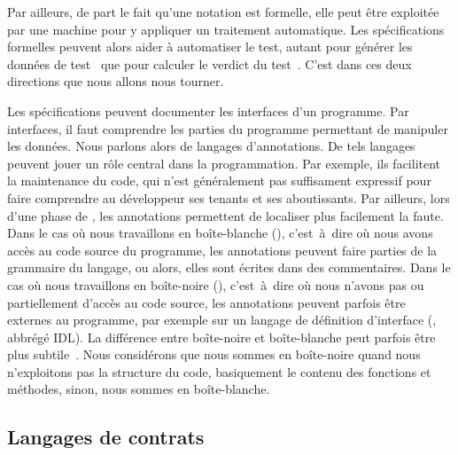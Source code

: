 Par ailleurs, de part le fait qu'une notation est formelle, elle peut être
exploitée par une machine pour y appliquer un traitement automatique.  Les
spécifications formelles peuvent alors aider à {\strong automatiser le test},
autant pour générer les données de test~ que pour calculer le verdict du test~.  C'est dans ces
deux directions que nous allons nous tourner.

Les spécifications peuvent documenter les {\strong interfaces} d'un programme.
Par interfaces, il faut comprendre les parties du programme permettant de
manipuler les données. Nous parlons alors de {\strong langages d'annotations}.
De tels langages peuvent jouer un rôle central dans la programmation. Par
exemple, ils facilitent la maintenance du code, qui n'est généralement pas
suffisament expressif pour faire comprendre au développeur ses tenants et ses
aboutissants. Par ailleurs, lors d'une phase de , les
annotations permettent de localiser plus facilement la faute. Dans le cas où
nous travaillons en boîte-blanche (), c'est~à~dire où nous
avons accès au code source du programme, les annotations peuvent faire parties
de la grammaire du langage, ou alors, elles sont écrites dans des {\strong
commentaires}. Dans le cas où nous travaillons en boîte-noire
(), c'est~à~dire où nous n'avons pas ou partiellement
d'accès au code source, les annotations peuvent parfois être externes au
programme, par exemple sur un langage de définition d'interface
(, abbrégé IDL). La différence entre
boîte-noire et boîte-blanche peut parfois être plus subtile~.
Nous considérons que nous sommes en boîte-noire quand nous n'exploitons pas la
structure du code, basiquement le contenu des fonctions et méthodes, sinon, nous
sommes en boîte-blanche.

\subsection{Langages de contrats}
\label{subsection:sota:dbc}

